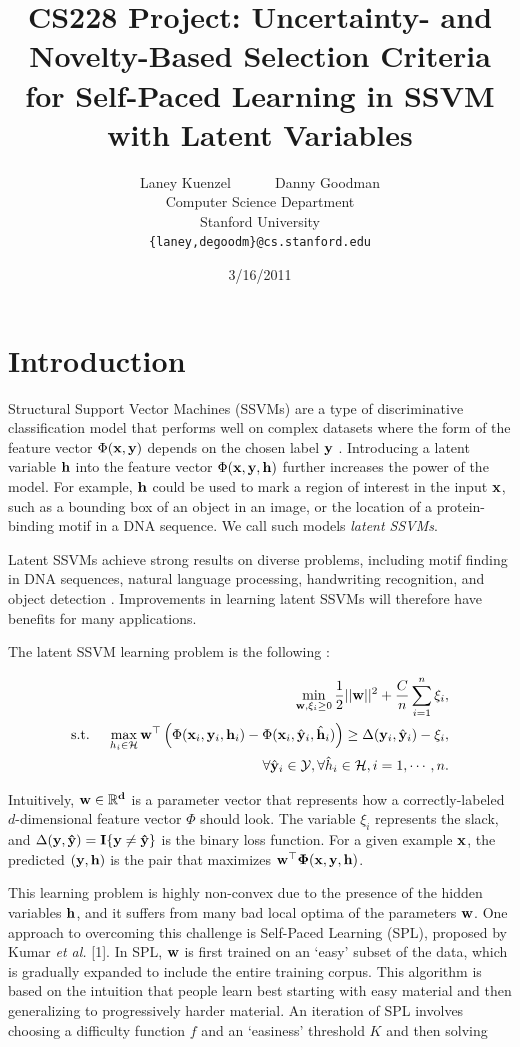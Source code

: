 \documentclass{article}
\title{CS228 Project: Uncertainty- and Novelty-Based Selection Criteria for Self-Paced Learning in SSVM with Latent Variables}
\date{3/16/2011}
\author{
Laney Kuenzel ~~~~~ Danny Goodman\\
Computer Science Department \\
Stanford University \\
\texttt{\{laney,degoodm\}@cs.stanford.edu}
}
\newcommand{\mysection}[1]{\vspace{-4mm}\section{#1}\vspace{-4mm}}
\begin{document}
\maketitle
\vspace{-8mm}

\mysection{Introduction}
\label{sec:introduction}
Structural Support Vector Machines (SSVMs) are a type of discriminative classification model that performs well on complex datasets where the form of the feature vector $\Phi(\bf x, \bf y)$ depends on the chosen label $\bf y$ \cite{SSVM}.  Introducing a latent variable $\bf h$ into the feature vector $\Phi(\bf x, \bf y, \bf h)$ further increases the power of the model.  For example, $\bf h$ could be used to mark a region of interest in the input $\bf x$, such as a bounding box of an object in an image, or the location of a protein-binding motif in a DNA sequence.  We call such models \emph{latent SSVMs}.

Latent SSVMs achieve strong results on diverse problems, including motif finding in DNA sequences, natural language processing, handwriting recognition, and object detection \cite{SPL,App1,SSVM}.  Improvements in learning latent SSVMs will therefore have benefits for many applications.

The latent SSVM learning problem is the following \cite{SPL}:

\begin{eqnarray}
&&\min_{{\bf w},\xi_i \geq 0} \frac{1}{2}||{\bf w}||^2 + \frac{C}{n} \sum_{i=1}^n \xi_i, \nonumber \\
\mbox{s.t. } && \max_{h_i \in {\cal H}} {\bf w}^\top \left(\Phi({\bf x}_i,{\bf y}_i,{\bf h}_i) - 
		\Phi({\bf x}_i,\hat{\bf y}_i,\hat{\bf h}_i) \right)
	 \geq \Delta({\bf y}_i,\hat{\bf y}_i) - \xi_i, \nonumber \\
\label{eq:latentSSVM}
&&\forall \hat{\bf y}_i \in {\cal Y}, \forall \hat{h}_i \in {\cal H}, i=1,\cdots,n.
\end{eqnarray}

Intuitively, $\bf w\in\mathbb{R}^d$ is a parameter vector that represents how a correctly-labeled $d$-dimensional feature vector $\Phi$ should look.  The variable $\xi_i$ represents the slack, and $\Delta(\bf y,\hat{\bf y})=I\{\bf y\neq \hat{\bf y}\}$ is the binary loss function.
For a given example $\bf x$, the predicted $(\bf y,\bf h)$ is the pair that maximizes $\bf{{w}} ^\top \Phi(\bf x,\bf y,\bf h)$.  

This learning problem is highly non-convex due to the presence of the hidden variables $\bf h$, and it suffers from many bad local optima of the parameters $\bf w$.  One approach to overcoming this challenge is Self-Paced Learning (SPL), proposed by Kumar \textit{et al.} [1]. In SPL, $\bf w$ is first trained on an `easy' subset of the data, which is gradually expanded to include the entire training corpus.  This algorithm is based on the intuition that people learn best starting with easy material and then generalizing to progressively harder material.  An iteration of SPL involves choosing a difficulty function $f$ and an `easiness' threshold $K$ and then solving
\end{document}
